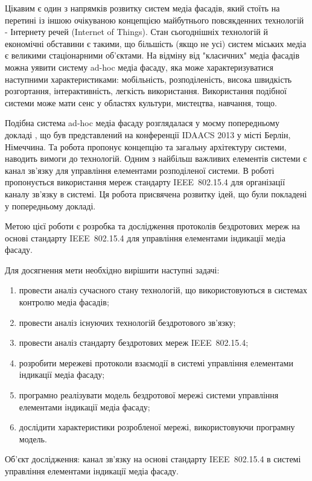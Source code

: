 \documentclass[a4paper,ukrainian,utf8,nocolumnsxix,floatsection,equationsection]{eskdtext}
\newcommand{\iee}[0]{IEEE~802.15.4\xspace}
\begin{document}
Цікавим є один з напрямків розвитку систем медіа фасадів, який стоїть на перетині із іншою очікуваною концепцією майбутнього повсякденних технологій - Інтернету речей (Internet of Things). Стан сьогоднішніх технологій й економічні обставини є такими, що більшість (якщо не усі) систем міських медіа є великими стаціонарними об’єктами. На відміну від "класичних" медіа фасадів можна уявити систему ad-hoc медіа фасаду, яка може характеризуватися наступними характеристиками: мобільність, розподіленість, висока швидкість розгортання, інтерактивність, легкість використання. Використання подібної системи може мати сенс у областях культури, мистецтва, навчання, тощо.

Подібна система ad-hoc медіа фасаду розглядалася у моєму попередньому докладі \cite{idaacs:2013:adhoc:media:facade}, що був представлений на конференції IDAACS 2013 у місті Берлін, Німеччина. Та робота пропонує концепцію та загальну архітектуру системи, наводить вимоги до технологій. Одним з найбільш важливих елементів системи є канал зв’язку для управління елементами розподіленої системи. В роботі пропонується використання мереж стандарту \iee для організації каналу зв’язку в системі. Ця робота присвячена розвитку ідей, що були покладені у попередньому докладі.

Метою цієї роботи є розробка та дослідження протоколів бездротових мереж на основі стандарту \iee для управління елементами індикації медіа фасаду.

Для досягнення мети необхідно вирішити наступні задачі:
\begin{enumerate}
	\item провести аналіз сучасного стану технологій, що використовуються в системах контролю медіа фасадів;
	\item провести аналіз існуючих технологій бездротового зв’язку;
	\item провести аналіз стандарту бездротових мереж \iee;
	\item розробити мережеві протоколи взаємодії в системі управління елементами індикації медіа фасаду;
	\item\label{task:create_model} програмно реалізувати модель бездротової мережі системи управління елементами індикації медіа фасаду;
	\item\label{task:do_simulation} дослідити характеристики розробленої мережі, використовуючи програмну модель.
\end{enumerate}

Об’єкт дослідження: канал зв’язку на основі стандарту \iee в системі управління елементами індикації медіа фасаду.
\end{document}
